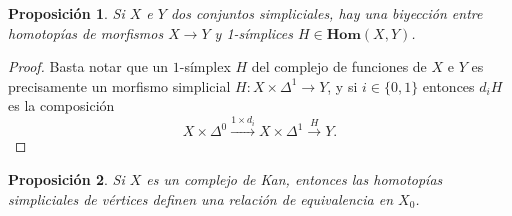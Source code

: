 \documentclass[11pt]{report}
\theoremstyle{colored}
\newtheorem{proposition}{Proposición}[section]
\renewcommand{\ss}[1]{\Delta^{#1}}
\newcommand{\homcomplex}{\mathbf{Hom}}
\begin{document}
\begin{proposition} Si $X$ e $Y$ dos conjuntos simpliciales, hay una biyección entre homotopías de morfismos $X \to Y$ y 1-símplices $H \in \homcomplex(X,Y)$.
\end{proposition}
\begin{proof} Basta notar que un $1$-símplex $H$ del complejo de funciones de $X$ e $Y$ es precisamente un morfismo simplicial $H : X \times \ss{1} \to Y$, y si $i \in \{0,1\}$ entonces $d_iH$ es la composición
\[
X \times \ss{0} \xrightarrow{1 \times d_i} X \times \ss{1} \xrightarrow{H} Y.
\] 
\end{proof}

\begin{proposition} Si $X$ es un complejo de Kan, entonces las homotopías simpliciales de vértices definen una relación de equivalencia en $X_0$.
\end{proposition}
\end{document}
